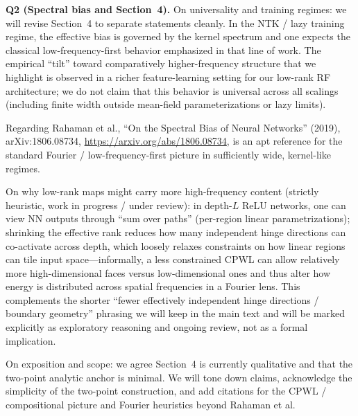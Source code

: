 \medskip
\noindent\textbf{Q2 (Spectral bias and Section~4).}\quad
On universality and training regimes: we will revise Section~4 to separate statements cleanly.
In the NTK / lazy training regime, the effective bias is governed by the kernel spectrum and one expects the classical low-frequency-first behavior emphasized in that line of work.
The empirical ``tilt'' toward comparatively higher-frequency structure that we highlight is observed in a richer feature-learning setting for our low-rank RF architecture; we do not claim that this behavior is universal across all scalings (including finite width outside mean-field parameterizations or lazy limits).

Regarding Rahaman et al., ``On the Spectral Bias of Neural Networks'' (2019), arXiv:1806.08734, \url{https://arxiv.org/abs/1806.08734}, is an apt reference for the standard Fourier / low-frequency-first picture in sufficiently wide, kernel-like regimes.

On why low-rank maps might carry more high-frequency content (strictly heuristic, work in progress / under review):
in depth-$L$ ReLU networks, one can view NN outputs through ``sum over paths'' (per-region linear parametrizations); shrinking the effective rank reduces how many independent hinge directions can co-activate across depth, which loosely relaxes constraints on how linear regions can tile input space---informally, a less constrained CPWL can allow relatively more high-dimensional faces versus low-dimensional ones and thus alter how energy is distributed across spatial frequencies in a Fourier lens.
This complements the shorter ``fewer effectively independent hinge directions / boundary geometry'' phrasing we will keep in the main text and will be marked explicitly as exploratory reasoning and ongoing review, not as a formal implication.

On exposition and scope: we agree Section~4 is currently qualitative and that the two-point analytic anchor is minimal.
We will tone down claims, acknowledge the simplicity of the two-point construction, and add citations for the CPWL / compositional picture and Fourier heuristics beyond Rahaman et al.
